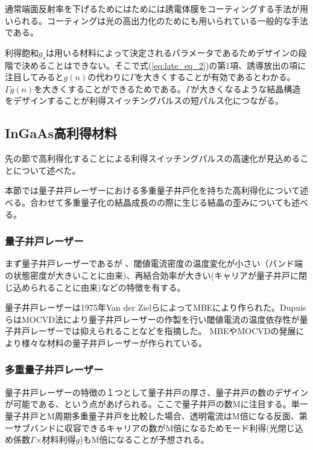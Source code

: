通常端面反射率を下げるためにはためには誘電体膜をコーティングする手法が用いられる。コーティングは光の高出力化のためにも用いられている一般的な手法である。

利得飽和$g_{s}$は用いる材料によって決定されるパラメータであるためデザインの段階で決めることはできない。そこで式(\ref{eq:late_eq_2})の第1項、誘導放出の項に注目してみると$g(n)$の代わりに$\Gamma$を大きくすることが有効であるとわかる。$\Gamma g(n)$を大きくすることができるためである。$\Gamma$が大きくなるような結晶構造をデザインすることが利得スイッチングパルスの短パルス化につながる。
\clearpage
\subsection{InGaAs高利得材料}
先の節で高利得化することによる利得スイッチングパルスの高速化が見込めることについて述べた。

本節では量子井戸レーザーにおける多重量子井戸化を持ちた高利得化について述べる。合わせて多重量子化の結晶成長のの際に生じる結晶の歪みについても述べる。
\subsubsection{量子井戸レーザー}
まず量子井戸レーザーであるが
、閾値電流密度の温度変化が小さい（バンド端の状態密度が大きいことに由来)、再結合効率が大きい(キャリアが量子井戸に閉じ込められることに由来)などの特徴を有する。


量子井戸レーザーは1975年Van der ZielらによってMBEにより作られた\cite{ref_van}。DupuisらはMOCVD法により量子井戸レーザーの作製を行い閾値電流の温度依存性が量子井戸レーザーでは抑えられることなどを指摘した\cite{ref_dupuis}。%
MBEやMOCVDの発展により様々な材料の量子井戸レーザーが作られている。
\subsubsection{多重量子井戸レーザー}
量子井戸レーザーの特徴の１つとして量子井戸の厚さ、量子井戸の数のデザインが可能である、という点があげられる。ここで量子井戸の数Mに注目する。単一量子井戸とM周期多重量子井戸を比較した場合、透明電流はM倍になる反面、第一サブバンドに収容できるキャリアの数がM倍になるためモード利得(光閉じ込め係数$\Gamma$×材料利得$g$)もM倍になることが予想される。

